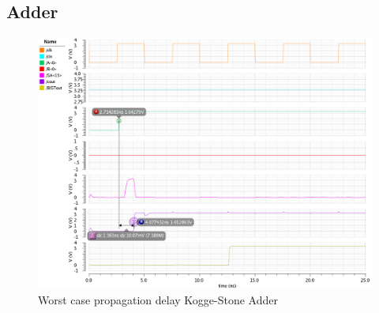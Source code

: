 \subsection{Adder}

\begin{figure}[H]
  \centering
  \captionsetup{justification=centering}
  \includegraphics[angle=90, scale=1]{../figures/kogge_delay}
  \caption{Worst case propagation delay Kogge-Stone Adder} \label{fig:kogge_delay}
\end{figure}

